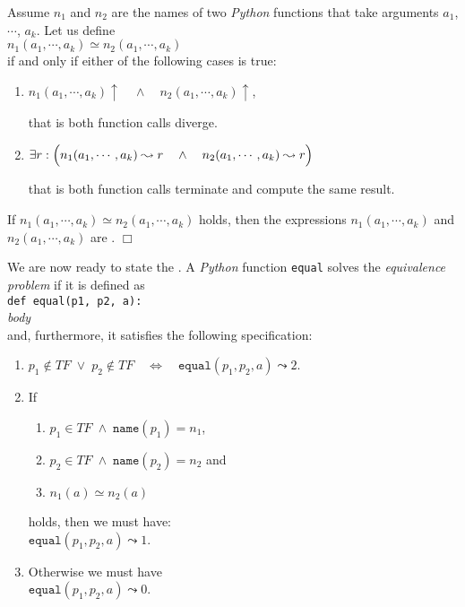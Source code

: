 \begin{Definition}[$\simeq$] 
Assume $n_1$ and $n_2$ are the names of two \textsl{Python} functions that take arguments
  $a_1$, $\cdots$, $a_k$.  Let us define \\[0.2cm]
\hspace*{1.3cm} 
$n_1(a_1,\cdots,a_k) \simeq n_2(a_1,\cdots,a_k)$ 
\\[0.2cm]
if and only if either of the following cases is true:
\begin{enumerate}
\item $n_1(a_1,\cdots,a_k)\uparrow \quad\wedge\quad n_2(a_1,\cdots,a_k)\uparrow$,

      that is both function calls diverge.
\item $\exists r: \Bigl(n_1(a_1,\cdots,a_k) \leadsto r \quad\wedge\quad n_2(a_1,\cdots,a_k) \leadsto
  r\Bigr)$

      that is both function calls terminate and compute the same result.
\end{enumerate}
If $n_1(a_1,\cdots,a_k) \simeq n_2(a_1,\cdots,a_k)$ holds, then the expressions $n_1(a_1,\cdots,a_k)$ and $n_2(a_1,\cdots,a_k)$ are 
. 
\hspace*{\fill} $\Box$
\end{Definition}

\noindent
We are now ready to state the .  A \textsl{Python} function \texttt{equal} solves the
\emph{equivalence problem}  if it is defined as
\\[0.2cm]
\hspace*{1.3cm} \texttt{def equal(p1, p2, a):}               \\
\hspace*{1.8cm} \textsl{body}                                \\[0.2cm]
and, furthermore, it satisfies the following specification:
\begin{enumerate}
\item $p_1 \not\in T\!F \;\vee\; p_2 \not\in T\!F \quad\Leftrightarrow\quad \mathtt{equal}(p_1, p_2, a) \leadsto 2$.
\item If 
      \begin{enumerate}
      \item $p_1 \in T\!F \;\wedge\; \mathtt{name}(p_1) = n_1$,
      \item $p_2 \in T\!F \;\wedge\; \mathtt{name}(p_2) = n_2$ \quad and
      \item $n_1(a) \simeq n_2(a)$
      \end{enumerate}
      holds, then we must have: 
      \\[0.2cm]
      \hspace*{1.3cm} 
      $\mathtt{equal}(p_1, p_2, a) \leadsto 1$.
\item Otherwise we must have \\[0.2cm]
      \hspace*{1.3cm} 
      $\mathtt{equal}(p_1, p_2, a) \leadsto 0$.
\end{enumerate}


